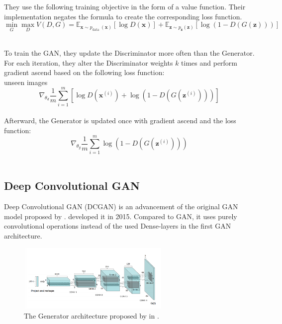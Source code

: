 They use the following training objective in the form of a value function. Their implementation negates the formula to create the corresponding loss function.\\

\begin{equation}
    \min _{G} \max _{D} V(D, G)=\mathbb{E}_{\boldsymbol{x} \sim p_{\text {data }}(\boldsymbol{x})}[\log D(\boldsymbol{x})]+\mathbb{E}_{\boldsymbol{z} \sim p_{\boldsymbol{z}}(\boldsymbol{z})}[\log (1-D(G(\boldsymbol{z})))]
\end{equation}\\

\newpage

To train the GAN, they update the Discriminator more often than the Generator. For each iteration, they alter the Discriminator weights $ k $ times and perform gradient ascend based on the following loss function:\\
unseen images
\begin{equation}
    \nabla_{\theta_{d}} \frac{1}{m} \sum_{i=1}^{m}\left[\log D\left(\boldsymbol{x}^{(i)}\right)+\log \left(1-D\left(G\left(\boldsymbol{z}^{(i)}\right)\right)\right)\right]
\end{equation}\\

Afterward, the Generator is updated once with gradient ascend and the loss function:\\

\begin{equation}
    \nabla_{\theta_{g}} \frac{1}{m} \sum_{i=1}^{m} \log \left(1-D\left(G\left(\boldsymbol{z}^{(i)}\right)\right)\right)
\end{equation}\\

\subsection{Deep Convolutional GAN}

Deep Convolutional GAN (DCGAN) is an advancement of the original GAN model proposed by \citeauthor{goodfellow2014generative}.  \citeauthor{radford2016dcgan} developed it in 2015. Compared to GAN, it uses purely convolutional operations instead of the used Dense-layers in the first GAN architecture.\\

\begin{figure}[H]
    \centering
    \includegraphics[width=0.65\textwidth]{resources/images/dcgan_generator.png}
    \caption{The Generator architecture proposed by \citeauthor{radford2016dcgan} in  \cite{radford2016dcgan}.}
    \label{fig:dcgan_generator}
\end{figure}

